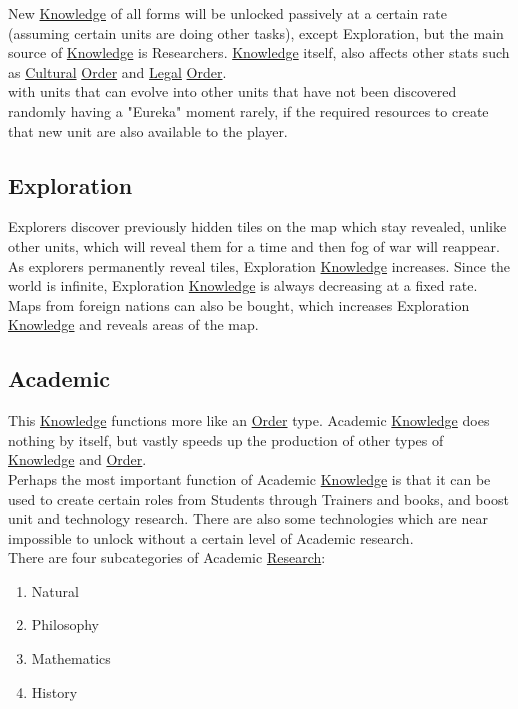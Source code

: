 \documentclass[11pt]{article}
\begin{document}
New \hyperref[orgd7203c2]{Knowledge} of all forms will be unlocked passively at a certain rate (assuming certain units are doing other tasks), except Exploration, but the main source of \hyperref[orgd7203c2]{Knowledge} is Researchers. \hyperref[orgd7203c2]{Knowledge} itself, also affects other stats such as \hyperref[org992a868]{Cultural} \hyperref[orgd146db7]{Order} and \hyperref[org39099d7]{Legal} \hyperref[orgd146db7]{Order}.\\

with units that can evolve into other units that have not been discovered randomly having a "Eureka" moment rarely, if the required resources to create that new unit are also available to the player.\\
\subsection{Exploration}
\label{sec:orgeaf6b13}
Explorers discover previously hidden tiles on the map which stay revealed, unlike other units, which will reveal them for a time and then fog of war will reappear. As explorers permanently reveal tiles, Exploration \hyperref[orgd7203c2]{Knowledge} increases. Since the world is infinite, Exploration \hyperref[orgd7203c2]{Knowledge} is always decreasing at a fixed rate. Maps from foreign nations can also be bought, which increases Exploration \hyperref[orgd7203c2]{Knowledge} and reveals areas of the map.\\
\subsection{Academic}
\label{sec:orgaa367fa}
This \hyperref[orgd7203c2]{Knowledge} functions more like an \hyperref[orgd146db7]{Order} type. Academic \hyperref[orgd7203c2]{Knowledge} does nothing by itself, but vastly speeds up the production of other types of \hyperref[orgd7203c2]{Knowledge} and \hyperref[orgd146db7]{Order}.\\

Perhaps the most important function of Academic \hyperref[orgd7203c2]{Knowledge} is that it can be used to create certain roles from Students through Trainers and books, and boost unit and technology research. There are also some technologies which are near impossible to unlock without a certain level of Academic research.\\

There are four subcategories of Academic \hyperref[orga5818bf]{Research}:\\
\begin{enumerate}
\item Natural\\
\item Philosophy\\
\item Mathematics\\
\item History\\
\end{enumerate}
\end{document}
